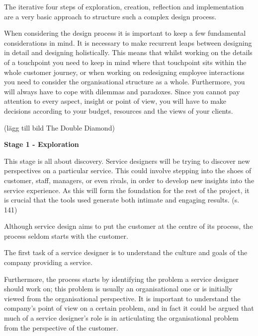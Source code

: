 The iterative four steps of exploration, creation, reflection and
implementation are a very basic approach to structure such a complex design process.


When considering the design process it is important to keep a few fundamental considerations in mind. It is necessary to make recurrent leaps between designing in detail and designing holistically. This means that whilst working on the details of a touchpoint you need to keep in mind where that touchpoint sits within the whole customer journey, or when working on redesigning employee interactions you need to consider the organisational structure as a whole. Furthermore, you will always have to cope with dilemmas and paradoxes. Since you cannot pay attention to every aspect, insight or point of view, you will have to make decisions according to your budget, resources and the views of your clients.


(lägg till bild The Double Diamond)

\textbf{Stage 1 - Exploration}

This stage is all about discovery. Service designers will be trying to discover new perspectives on a particular service. This could involve stepping into the shoes of customer, staff, managers, or even rivals, in order to develop new insights into the service experience. As this will form the foundation for the rest of the project, it is crucial that the tools used generate both intimate and engaging results. (s. 141)

Although service design aims to put the customer at the centre of its process, the process seldom starts with the customer.

The first task of a service designer is to understand the culture and goals of the company providing a service.

Furthermore, the process starts by identifying the problem a service designer should work on; this problem is usually an organisational one or is initially viewed from the organisational perspective. It is important to understand the company’s point of view on a certain problem, and in fact it could be argued that much of a service designer’s role is in articulating the organisational problem from the perspective of the customer.

